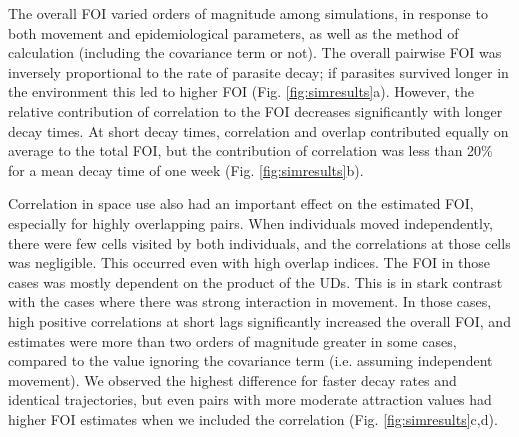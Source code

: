 \documentclass[letterpaper]{article}
\begin{document}
The overall FOI varied orders of magnitude among simulations, in response to both movement and epidemiological parameters, as well as the method of calculation (including the covariance term or not). 
The overall pairwise FOI was inversely proportional to the rate of parasite decay; if parasites survived  longer in the environment this led to higher FOI (Fig. \ref{fig:simresults}a). However, the relative contribution of correlation to the FOI decreases significantly with longer decay times. At short decay times, correlation and overlap contributed equally on average to the total FOI, but the contribution of correlation was less than 20\% for a mean decay time of one week (Fig. \ref{fig:simresults}b). 


Correlation in space use also had an important effect on the estimated FOI, especially for highly overlapping pairs. 
When individuals moved independently, there were few cells visited by both individuals, and the correlations at those cells was negligible. This occurred even with high overlap indices. The FOI in those cases was mostly dependent on the product of the UDs. %
This is in stark contrast with the cases where there was strong interaction in movement. 
In those cases, high positive correlations at short lags significantly increased the overall FOI, and estimates were more than two orders of magnitude greater in some cases, compared to the value ignoring the covariance term (i.e. assuming independent movement). We observed the highest difference for faster decay rates and identical trajectories, but even pairs with more moderate attraction values had higher FOI estimates when we included the correlation (Fig. \ref{fig:simresults}c,d).
\end{document}
